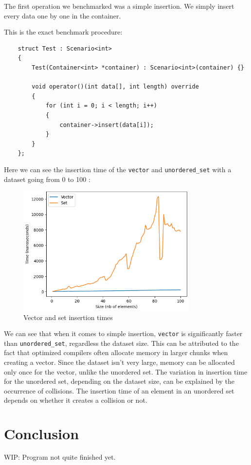 \documentclass[conference]{IEEEtran} \IEEEoverridecommandlockouts
\def\code#1{\texttt{#1}}
\begin{document}
The first operation we benchmarked was a simple insertion. We simply 
insert every data one by one in the container. 

This is the exact benchmark procedure:
\begin{lstlisting}
	struct Test : Scenario<int>
	{
		Test(Container<int> *container) : Scenario<int>(container) {}
		
		void operator()(int data[], int length) override
		{
			for (int i = 0; i < length; i++)
			{
				container->insert(data[i]);
			}
		}
	};
\end{lstlisting}

Here we can see the insertion time of the \code{vector} and 
\code{unordered\_set} with a dataset going from 0 to 100 :

\begin{figure}[!h]
	\includegraphics[width=9cm]{Diagram/insertion.png}
	\caption{Vector and set insertion times}
	\label{vector vs set}
\end{figure}

We can see that when it comes to simple insertion, \code{vector} is 
significantly  faster than \code{unordered\_set}, regardless the 
dataset size. This can be attributed to the fact that optimized 
compilers often allocate memory in larger chunks when creating a vector. 
Since the dataset isn't very large, memory can be allocated only once 
for the vector, unlike the unordered set. The variation in insertion 
time for the unordered set, depending on the dataset size, can be 
explained by the occurrence of collisions. The insertion time of an 
element in an unordered set depends on whether it creates a collision 
or not.

\section{Conclusion}

WIP: Program not quite finished yet.

 
\end{document}
